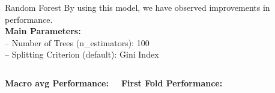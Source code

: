 \documentclass[12pt,aspectratio=169,notheorems]{beamer}
\begin{document}
\begin{frame}{Random Forest}
    \vspace{0.3cm}
        By using this model, we have observed improvements in performance.\\
        \vspace{0.2cm}
        \textbf{Main Parameters:} \\
        \vspace{0.1cm}
        -- Number of Trees (n\_estimators): 100 \\
        -- Splitting Criterion (default): Gini Index \\
        \vspace{0.5cm}
            \begin{columns}[T]
            \centering
            \textbf{Macro avg Performance:}
            \vspace{0.2cm}
            \begin{table}[]
            \end{table}
            \centering
            \textbf{First Fold Performance:}
            \vspace{0.2cm}
            \begin{table}[]
\end{table}
\end{columns}
\end{frame}
\end{document}
